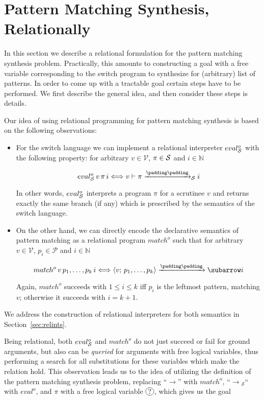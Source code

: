 \section{Pattern Matching Synthesis, Relationally}
\label{sec:relationally}

In this section we describe a relational formulation for the pattern matching synthesis problem. Practically,
this amounts to constructing a goal with a free variable corresponding to the switch program to synthesize
for (arbitrary) list of patterns. In order to come up with a tractable goal certain steps have to be performed.
We first describe the general idea, and then consider these steps is details.

Our idea of using relational programming for pattern matching synthesis is based on the following observations:

\begin{itemize}
\item For the switch language we can implement a relational interpreter $eval^o_{\mathcal{S}}$ with the following property: for
  arbitrary $v\in\mathcal V$, $\pi\in\mathcal{S}$ and $i\in\mathbb N$
 
  \[
  \setarrow{\xrightarrow}
  \setsubarrow{_\ir}
   eval^o_\ir\, v\, \pi\, i \Longleftrightarrow \withenv{v}{\trans{\pi}{}{i}}
  \]

  In other words, $eval^o_{\mathcal{S}}$ interprets a program $\pi$ for a scrutinee $v$ and returns exactly the same branch (if any)
  which is prescribed by the semantics of the switch language. 
  
\item On the other hand, we can directly encode the declarative semantics of pattern matching as a relational
  program $match^o$ such that for arbitrary $v\in\mathcal V$, $p_i\in\mathcal P$ and $i\in\mathbb N$

  \[
  \setarrow{\xrightarrow}
  match^o\,v\,p_1,\dots,p_k\,i \Longleftrightarrow \trans{\inbr{v;\,p_1,\dots,p_k}}{}{i}
  \]

  Again, $match^o$ succeeds with $1\le i\le k$ iff $p_i$ is the leftmost pattern, matching $v$; otherwise it
  succeeds with $i=k+1$.
\end{itemize}

We address the construction of relational interpreters for both semantics in Section~\ref{sec:relints}.

Being relational, both $eval^o_{\mathcal{S}}$ and $match^o$ do not just succeed or fail for ground arguments, but also can be \emph{queried} for
arguments with free logical variables, thus performing a search for all substitutions for these variables which make the
relation hold. This observation leads us to the idea of utilizing the definition of the pattern matching
synthesis problem, replacing ``$\xrightarrow{}{}\!\!$'' with $match^o$, ``$\xrightarrow{}{}_{\!\!\!\mathcal S}$`` with $eval^o$,
and $\pi$ with a free logical variable $\circled{?}$, which gives us the goal

